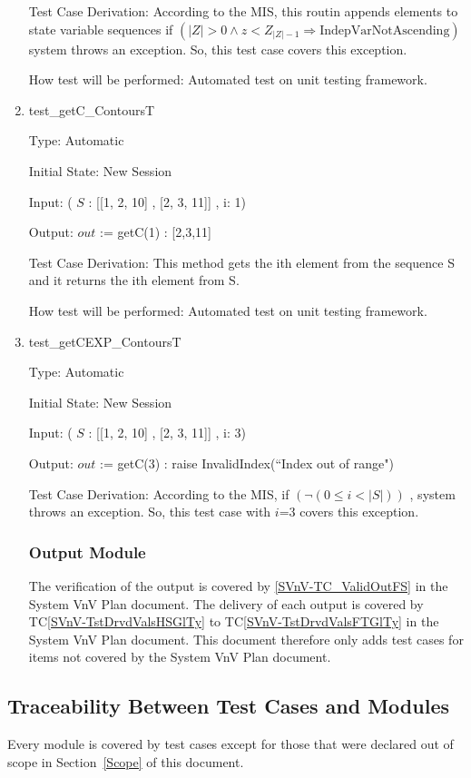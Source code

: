 \documentclass[12pt]{article}
\newcommand{\tcref}[1]{TC\ref{#1}}
\newcounter{utestnum} %
\begin{document}
\begin{enumerate}[label=TC\arabic*:,ref={\arabic*}]
Test Case Derivation: According to the MIS, this routin appends elements to state variable sequences if $(|Z| > 0 \wedge z
< Z_{|Z|-1} \Rightarrow \mbox{IndepVarNotAscending})$ system throws an exception. So, this test case covers this exception.

How test will be performed: Automated test on unit testing framework.


\item [TC\refstepcounter{utestnum}\theutestnum: \label{getCContoursTest}] 
test\_getC\_ContoursT

Type: Automatic

Initial State: New Session

Input: ( $S$ : [[1, 2, 10] , [2, 3, 11]] , i: 1)

Output: $out$ := getC(1) : [2,3,11]


Test Case Derivation: This method gets the ith element from the sequence S and it returns the ith element from S.

How test will be performed: Automated test on unit testing framework.

\item [TC\refstepcounter{utestnum}\theutestnum: \label{getCEXPContoursTest}] 
test\_getCEXP\_ContoursT

Type: Automatic

Initial State: New Session

Input: ( $S$ : [[1, 2, 10] , [2, 3, 11]] , i: 3)

Output: $out$ := getC(3) : raise InvalidIndex(``Index out of range")


Test Case Derivation: According to the MIS, if $(\neg(0 \leq i < |S|))$ , system throws an exception. So, this test case with $i$=3 covers this exception.



\subsubsection{Output Module}	

The verification of the output is covered by \ref{SVnV-TC_ValidOutFS} in the 
System VnV Plan document. The delivery of each output is covered by 
\tcref{SVnV-TstDrvdValsHSGlTy} to \tcref{SVnV-TstDrvdValsFTGlTy} in the System VnV Plan 
document. This document therefore only adds test cases for items not covered by 
the System VnV Plan document.


\end{enumerate}

\subsection{Traceability Between Test Cases and Modules}

Every module is covered by test cases except for those that were 
declared out of scope in Section~\ref{Scope} of this document.




\newpage


\end{document}

